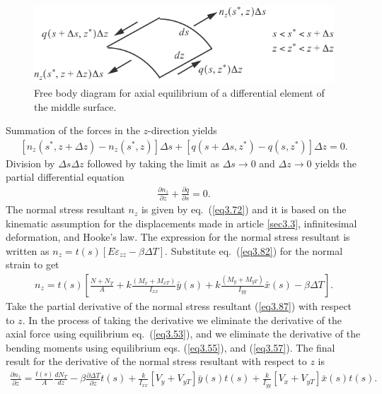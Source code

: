 \documentclass{AeroStructure-ERJohnson}
\begin{document}
{\def\thefigure{3.10}
\begin{figure}[!h]
\centerline{\includegraphics{Figure_3-10.pdf}}
\caption{Free body diagram for axial equilibrium of a differential element of the middle surface.}\label{fig3.10}
\end{figure}}

Summation of the forces in the $z$-direction yields
\begin{align}\label{eq3.85}
\left[n_{z}\left(s^{*}, z+\Delta z\right)-n_{z}\left(s^{*}, z\right)\right] \Delta s+\left[q\left(s+\Delta s, z^{*}\right)-q\left(s, z^{*}\right)\right] \Delta z=0.
\end{align}
Division by $\Delta s\Delta z$ followed by taking the limit as $\Delta s \rightarrow 0$ and $\Delta z \rightarrow 0$ yields the partial differential equation
\begin{align}\label{eq3.86}
\frac{\partial n_{z}}{\partial z}+\frac{\partial q}{\partial s}=0.
\end{align}
The normal stress resultant $n_z$ is given by eq.~(\ref{eq3.72}) and it is based on the kinematic assumption for the displacements made in article \ref{sec3.3}, infinitesimal deformation, and Hooke's law. The expression for the normal stress resultant is written as $n_{z}=t(s)[E \varepsilon_{z z}-\beta \Delta T]$. Substitute eq.~(\ref{eq3.82}) for the normal strain to get
\begin{align}\label{eq3.87}
n_{z}=t(s)\left[\frac{N+N_{T}}{A}+k \frac{\left(M_{x}+M_{x T}\right)}{I_{x x}} \bar{y}(s)+k \frac{\left(M_{y}+M_{y T}\right)}{I_{y y}} \bar{x}(s)-\beta \Delta T\right].
\end{align}
Take the partial derivative of the normal stress resultant (\ref{eq3.87}) with respect to $z$. In the process of taking the derivative we eliminate the derivative of the axial force using equilibrium eq.~(\ref{eq3.53}), and we eliminate the derivative of the bending moments using equilibrium eqs. (\ref{eq3.55}), and (\ref{eq3.57}). The final result for the derivative of the normal stress resultant with respect to $z$ is
\begin{align}\label{eq3.88}
\frac{\partial n_{z}}{\partial z}=\frac{t(s)}{A} \frac{d N_{T}}{d z}-\beta \frac{\partial \Delta T}{\partial z} t(s)+\frac{k}{I_{x x}}\left[V_{y}+V_{y T}\right] \bar{y}(s) t(s)+\frac{k}{I_{y y}}\left[V_{x}+V_{y T}\right] \bar{x}(s) t(s).
\end{align}
\end{document}
